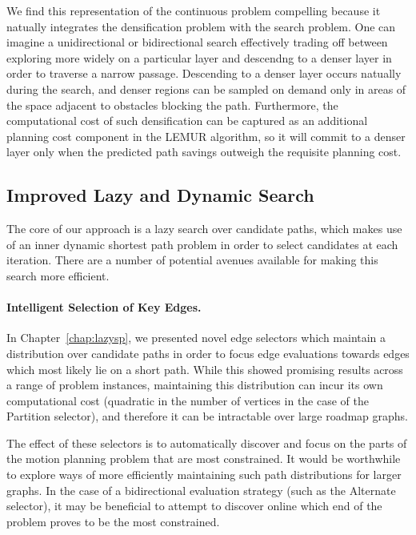 We find this representation of the continuous problem compelling
because it natually integrates the densification problem with
the search problem.
One can imagine a unidirectional or bidirectional search
effectively trading off between
exploring more widely on a particular layer
and descendng to a denser layer in order to traverse a narrow passage.
Descending to a denser layer occurs natually during the search,
and denser regions can be sampled on demand only in areas of the space
adjacent to obstacles blocking the path.
Furthermore,
the computational cost of such densification can be captured as
an additional planning cost component in the LEMUR algorithm,
so it will commit to a denser layer only when the predicted path
savings outweigh the requisite planning cost.

\subsection{Improved Lazy and Dynamic Search}

The core of our approach is a lazy search over candidate paths,
which makes use of an inner dynamic shortest path problem
in order to select candidates at each iteration.
There are a number of potential avenues available for making this
search more efficient.

\paragraph{Intelligent Selection of Key Edges.}
In Chapter~\ref{chap:lazysp},
we presented novel edge selectors which maintain a distribution over
candidate paths
in order to focus edge evaluations towards edges which most likely
lie on a short path.
While this showed promising results across a range of problem instances,
maintaining this distribution can incur its own computational cost
(quadratic in the number of vertices in the case of the Partition
selector),
and therefore it can be intractable over large roadmap graphs.

The effect of these selectors is to automatically discover
and focus on the parts of the motion planning problem that are
most constrained.
It would be worthwhile to explore ways of more efficiently maintaining
such path distributions for larger graphs.
In the case of a bidirectional evaluation strategy
(such as the Alternate selector),
it may be beneficial to attempt to discover online which end
of the problem proves to be the most constrained.

